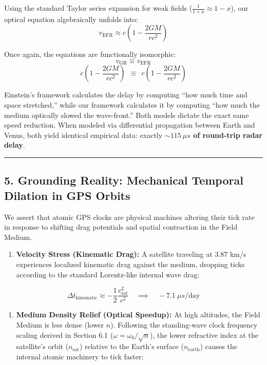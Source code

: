 \documentclass[
]{article}
\providecommand{\tightlist}{%
  \setlength{\itemsep}{0pt}\setlength{\parskip}{0pt}}
\begin{document}
Using the standard Taylor series expansion for weak fields
(\(\frac{1}{1+x} \approx 1-x\)), our optical equation algebraically
unfolds into:
\[ v_{\text{EFR}} \approx c \left( 1 - \frac{2GM}{rc^2} \right) \]

Once again, the equations are functionally isomorphic:
\[ v_{\text{GR}} \equiv v_{\text{EFR}} \]
\[ c \left( 1 - \frac{2GM}{rc^2} \right) \ \ \equiv \ \ c \left( 1 - \frac{2GM}{rc^2} \right) \]

Einstein's framework calculates the delay by computing ``how much time
and space stretched,'' while our framework calculates it by computing
``how much the medium optically slowed the wave-front.'' Both models
dictate the exact same speed reduction. When modeled via differential
propagation between Earth and Venus, both yield identical empirical
data: exactly \textbf{\(\sim 115 \ \mu s\) of round-trip radar delay}.

\begin{center}\rule{0.5\linewidth}{0.5pt}\end{center}

\subsection{5. Grounding Reality: Mechanical Temporal Dilation in GPS
Orbits}\label{grounding-reality-mechanical-temporal-dilation-in-gps-orbits}

We assert that atomic GPS clocks are physical machines altering their
tick rate in response to shifting drag potentials and spatial
contraction in the Field Medium.

\begin{enumerate}
\def\labelenumi{\arabic{enumi}.}
\tightlist
\item
  \textbf{Velocity Stress (Kinematic Drag):} A satellite traveling at
  \(3.87\) km/s experiences localized kinematic drag against the medium,
  dropping ticks according to the standard Lorentz-like internal wave
  drag:
\end{enumerate}

\[ \Delta t_{\text{kinematic}} \approx -\frac{1}{2} \frac{v_{\text{sat}}^2}{c^2} \quad \implies \quad -7.1 \ \mu s\text{/day} \]

\begin{enumerate}
\def\labelenumi{\arabic{enumi}.}
\setcounter{enumi}{1}
\tightlist
\item
  \textbf{Medium Density Relief (Optical Speedup):} At high altitudes,
  the Field Medium is less dense (lower \(n\)). Following the
  standing-wave clock frequency scaling derived in Section 6.1
  (\(\omega = \omega_0 / \sqrt{n}\)), the lower refractive index at the
  satellite's orbit (\(n_{\text{sat}}\)) relative to the Earth's surface
  (\(n_{\text{earth}}\)) causes the internal atomic machinery to tick
  faster:
\end{enumerate}
\end{document}

